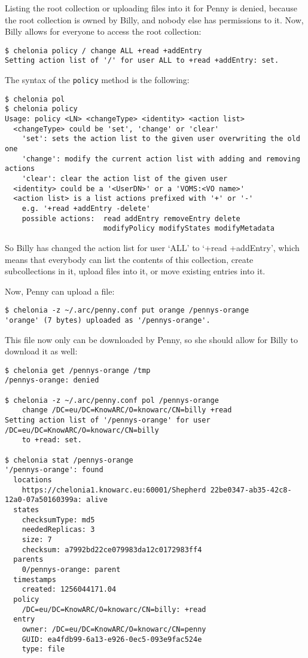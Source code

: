\documentclass{article}
\begin{document}
Listing the root collection or uploading files into it for Penny is denied, because the root collection is owned by Billy, and nobody else has permissions to it. Now, Billy allows for everyone to access the root collection:

\begin{verbatim}
$ chelonia policy / change ALL +read +addEntry
Setting action list of '/' for user ALL to +read +addEntry: set.
\end{verbatim}

The syntax of the \verb!policy! method is the following:

\begin{verbatim}
$ chelonia pol
$ chelonia policy
Usage: policy <LN> <changeType> <identity> <action list>
  <changeType> could be 'set', 'change' or 'clear'
    'set': sets the action list to the given user overwriting the old one
    'change': modify the current action list with adding and removing actions
    'clear': clear the action list of the given user
  <identity> could be a '<UserDN>' or a 'VOMS:<VO name>'
  <action list> is a list actions prefixed with '+' or '-'
    e.g. '+read +addEntry -delete'
    possible actions:  read addEntry removeEntry delete
                       modifyPolicy modifyStates modifyMetadata
\end{verbatim}

So Billy has changed the action list for user `ALL' to `+read +addEntry', which means that everybody can list the contents of this collection, create subcollections in it, upload files into it, or move existing entries into it.

Now, Penny can upload a file:

\begin{verbatim}
$ chelonia -z ~/.arc/penny.conf put orange /pennys-orange
'orange' (7 bytes) uploaded as '/pennys-orange'.
\end{verbatim}

This file now only can be downloaded by Penny, so she should allow for Billy to download it as well:

\begin{verbatim}
$ chelonia get /pennys-orange /tmp
/pennys-orange: denied

$ chelonia -z ~/.arc/penny.conf pol /pennys-orange
    change /DC=eu/DC=KnowARC/O=knowarc/CN=billy +read
Setting action list of '/pennys-orange' for user /DC=eu/DC=KnowARC/O=knowarc/CN=billy
    to +read: set.

$ chelonia stat /pennys-orange
'/pennys-orange': found
  locations
    https://chelonia1.knowarc.eu:60001/Shepherd 22be0347-ab35-42c8-12a0-07a50160399a: alive
  states
    checksumType: md5
    neededReplicas: 3
    size: 7
    checksum: a7992bd22ce079983da12c0172983ff4
  parents
    0/pennys-orange: parent
  timestamps
    created: 1256044171.04
  policy
    /DC=eu/DC=KnowARC/O=knowarc/CN=billy: +read
  entry
    owner: /DC=eu/DC=KnowARC/O=knowarc/CN=penny
    GUID: ea4fdb99-6a13-e926-0ec5-093e9fac524e
    type: file
\end{verbatim}
\end{document}
